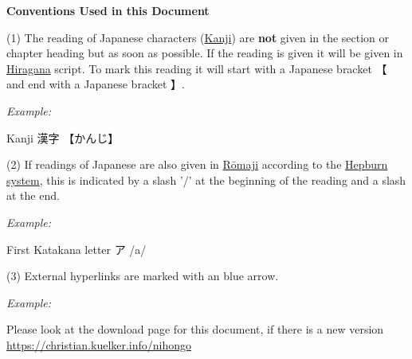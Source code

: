 

\label{para:Conventions}

\medskip

\textbf{Conventions Used in this Document}

\medskip

(1) The reading of Japanese characters (\hyperref[sec:Kanji]{Kanji}) are
\textbf{not} given in the section or chapter heading but as soon as possible.
If the reading is given it will be given in \hyperref[sec:Hiragana]{Hiragana}
script. To mark this reading it will start with a Japanese bracket {【} and end
with a Japanese bracket {】}.

\medskip
\textit{Example:}

\medskip
\begin{center} \Large Kanji {漢字} {【かんじ】} \end{center}
\medskip

(2) If readings of Japanese are also given in \hyperref[sec:Romaji]{Rōmaji}
according to the \hyperref[sec:Hepburn]{Hepburn system}, this is indicated by a
slash '/' at the beginning of the reading and a slash at the end.

\medskip
\textit{Example:}

\medskip
\begin{center} First Katakana letter \Large {ア} {/a/} \end{center}

\medskip

(3) External hyperlinks are marked with an blue arrow.

\medskip
\textit{Example:}

\medskip

\begin{center}

Please look at the download page for this document, if there is a new version\\
\Link
\href{https://christian.kuelker.info/nihongo}{https://christian.kuelker.info/nihongo}

\end{center}

